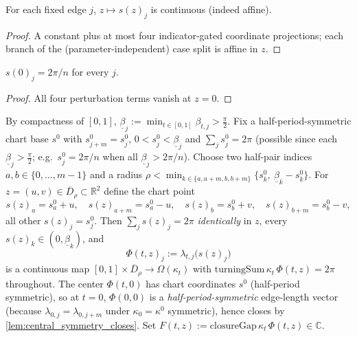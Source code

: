 \begin{lemma}

  \label{lem:continuous_chart_perturb}
  For each fixed edge $j$, $z \mapsto s(z)_j$ is continuous (indeed affine).
\end{lemma}
\begin{proof}

\leanok
  A constant plus at most four indicator-gated coordinate projections; each
  branch of the (parameter-independent) case split is affine in $z$.
\end{proof}

\begin{lemma}

  \label{lem:chart_perturb_zero}
  $s(0)_j = 2\pi/n$ for every $j$.
\end{lemma}
\begin{proof}

\leanok
  All four perturbation terms vanish at $z = 0$.
\end{proof}

\begin{definition}
  \label{def:closing_2cell}
  By compactness of $[0,1]$, $\underline\beta_j := \min_{t\in[0,1]}\beta_{t,j} >
  \tfrac\pi2$. Fix a half-period-symmetric chart base $s^0$ with $s^0_{j+m} =
  s^0_j$, $0 < s^0_j < \underline\beta_j$ and $\sum_j s^0_j = 2\pi$ (possible since
  each $\underline\beta_j > \tfrac\pi2$; e.g.\ $s^0_j = 2\pi/n$ when all
  $\underline\beta_j > 2\pi/n$). Choose two half-pair indices $a,b \in
  \{0,\dots,m-1\}$ and a radius
  $\rho < \min_{k\in\{a,a+m,b,b+m\}}\{s^0_k,\ \underline\beta_k - s^0_k\}$. For
  $z = (u,v) \in \overline{D}_\rho \subset \mathbb{R}^2$ define the chart point
  \[
    s(z)_a = s^0_a + u,\quad s(z)_{a+m} = s^0_a - u,\quad
    s(z)_b = s^0_b + v,\quad s(z)_{b+m} = s^0_b - v,
  \]
  all other $s(z)_j = s^0_j$. Then $\sum_j s(z)_j = 2\pi$ \emph{identically} in
  $z$, every $s(z)_k \in (0,\underline\beta_k)$, and
  \[
    \Phi(t,z)_j := \lambda_{t,j}\bigl(s(z)_j\bigr)
  \]
  is a continuous map $[0,1]\times\overline{D}_\rho \to \Omega(\kappa_t)$ with
  $\mathrm{turningSum}\,\kappa_t\,\Phi(t,z) = 2\pi$ throughout. The center
  $\Phi(t,0)$ has chart coordinates $s^0$ (half-period symmetric), so at $t=0$,
  $\Phi(0,0)$ is a \emph{half-period-symmetric} edge-length vector (because
  $\lambda_{0,j} = \lambda_{0,j+m}$ under $\kappa_0 = \kappa^0$ symmetric), hence
  closes by \cref{lem:central_symmetry_closes}. Set
  $F(t,z) := \mathrm{closureGap}\,\kappa_t\,\Phi(t,z) \in \mathbb{C}$.
\end{definition}

